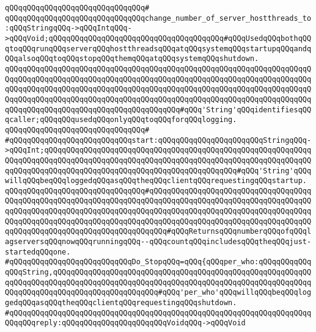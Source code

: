 \verb|qQQqqQQqqQQqqQQqqQQqqQQqqQQqqQQq#|\newline
\newline
\verb|qQQqqQQqqQQqqQQqqQQqqQQqqQQqqQQqchange_number_of_server_hostthreads_to:qQQqStringqQQq->qQQqIntqQQq->qQQqVoid;qQQqqQQqqQQqqQQqqQQqqQQqqQQqqQQqqQQqqQQq#qQQqUsedqQQqbothqQQqtoqQQqrunqQQqserverqQQqhostthreadsqQQqatqQQqsystemqQQqstartupqQQqandqQQqalsoqQQqtoqQQqstopqQQqthemqQQqatqQQqsystemqQQqshutdown.|\newline
\verb|qQQqqQQqqQQqqQQqqQQqqQQqqQQqqQQqqQQqqQQqqQQqqQQqqQQqqQQqqQQqqQQqqQQqqQQqqQQqqQQqqQQqqQQqqQQqqQQqqQQqqQQqqQQqqQQqqQQqqQQqqQQqqQQqqQQqqQQqqQQqqQQqqQQqqQQqqQQqqQQqqQQqqQQqqQQqqQQqqQQqqQQqqQQqqQQqqQQqqQQqqQQqqQQqqQQqqQQqqQQqqQQqqQQqqQQqqQQqqQQqqQQqqQQqqQQqqQQqqQQqqQQqqQQqqQQqqQQqqQQqqQQqqQQqqQQqqQQqqQQqqQQqqQQqqQQqqQQqqQQq#qQQq'String'qQQqidentifiesqQQqcaller;qQQqqQQqusedqQQqonlyqQQqtoqQQqforqQQqlogging.|\newline
\newline
\verb|qQQqqQQqqQQqqQQqqQQqqQQqqQQqqQQq#|\newline
\verb|#qQQqqQQqqQQqqQQqqQQqqQQqqQQqstart:qQQqqQQqqQQqqQQqqQQqqQQqStringqQQq->qQQqInt;qQQqqQQqqQQqqQQqqQQqqQQqqQQqqQQqqQQqqQQqqQQqqQQqqQQqqQQqqQQqqQQqqQQqqQQqqQQqqQQqqQQqqQQqqQQqqQQqqQQqqQQqqQQqqQQqqQQqqQQqqQQqqQQqqQQqqQQqqQQqqQQqqQQqqQQqqQQqqQQqqQQqqQQqqQQqqQQqqQQqqQQq#qQQq'String'qQQqwillqQQqbeqQQqloggedqQQqasqQQqtheqQQqclientqQQqrequestingqQQqstartup.|\newline
\verb|qQQqqQQqqQQqqQQqqQQqqQQqqQQqqQQq#qQQqqQQqqQQqqQQqqQQqqQQqqQQqqQQqqQQqqQQqqQQqqQQqqQQqqQQqqQQqqQQqqQQqqQQqqQQqqQQqqQQqqQQqqQQqqQQqqQQqqQQqqQQqqQQqqQQqqQQqqQQqqQQqqQQqqQQqqQQqqQQqqQQqqQQqqQQqqQQqqQQqqQQqqQQqqQQqqQQqqQQqqQQqqQQqqQQqqQQqqQQqqQQqqQQqqQQqqQQqqQQqqQQqqQQqqQQqqQQqqQQqqQQqqQQqqQQqqQQqqQQqqQQqqQQqqQQqqQQqqQQq#qQQqReturnsqQQqnumberqQQqofqQQqlagserversqQQqnowqQQqrunningqQQq--qQQqcountqQQqincludesqQQqtheqQQqjust-startedqQQqone.|\newline
\newline
\verb|#qQQqqQQqqQQqqQQqqQQqqQQqqQQqDo_StopqQQq=qQQq{qQQqper_who:qQQqqQQqqQQqqQQqString,qQQqqQQqqQQqqQQqqQQqqQQqqQQqqQQqqQQqqQQqqQQqqQQqqQQqqQQqqQQqqQQqqQQqqQQqqQQqqQQqqQQqqQQqqQQqqQQqqQQqqQQqqQQqqQQqqQQqqQQqqQQqqQQqqQQqqQQqqQQqqQQqqQQqqQQqqQQqqQQqqQQq#qQQq'per_who'qQQqwillqQQqbeqQQqloggedqQQqasqQQqtheqQQqclientqQQqrequestingqQQqshutdown.|\newline
\verb|#qQQqqQQqqQQqqQQqqQQqqQQqqQQqqQQqqQQqqQQqqQQqqQQqqQQqqQQqqQQqqQQqqQQqqQQqqQQqreply:qQQqqQQqqQQqqQQqqQQqqQQqVoidqQQq->qQQqVoid|\newline
